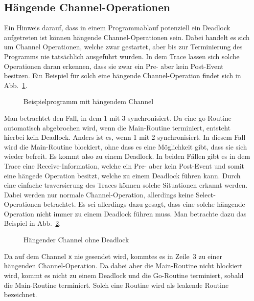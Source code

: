 \subsection{Hängende Channel-Operationen} 
Ein Hinweis darauf, dass in einem Programmablauf potenziell ein Deadlock aufgetreten ist können hängende Channel-Operationen
sein. Dabei handelt es sich um Channel Operationen, welche zwar gestartet, aber bis zur Terminierung des 
Programms nie tatsächlich ausgeführt wurden. In dem Trace lassen sich solche Operationen daran erkennen, dass sie 
zwar ein Pre- aber kein Post-Event besitzen. Ein Beispiel für solch eine hängende Channel-Operation findet sich in 
Abb.~\ref{Chap:Analyze-Sec:Channel-SubSec:Dangling-Fig:ExDangling}.
\begin{figure}[h!]
  
  \caption{Beispielprogramm mit hängendem Channel}
  \label{Chap:Analyze-Sec:Channel-SubSec:Dangling-Fig:ExDangling}
\end{figure}
Man betrachtet den Fall, in dem 1 mit 3 synchronisiert. Da eine go-Routine automatisch abgebrochen wird, 
wenn die Main-Routine terminiert, entsteht hierbei kein Deadlock. Anders ist es, wenn 1 mit 2 synchronisiert. 
In diesem Fall wird die Main-Routine blockiert, ohne dass es eine Möglichkeit gibt, dass sie sich wieder 
befreit. Es kommt also zu einem Deadlock. In beiden Fällen gibt es in dem Trace eine Receive-Information, 
welche ein Pre- aber kein Post-Event und somit eine hängede Operation besitzt, welche zu einem Deadlock 
führen kann. Durch eine einfache traversierung des Traces können solche Situationen erkannt werden. Dabei 
werden nur normale Channel-Operation, allerdings keine Select-Operationen betrachtet.
Es sei allerdings dazu gesagt, dass eine solche hängende Operation nicht immer zu einem Deadlock führen muss.
Man betrachte dazu das Beispiel in Abb.~\ref{Chap:Analyze-Sec:Channel-SubSec:Dangling-Fig:ExDanglingWithout}.
\begin{figure}[h!]
  
  \caption{Hängender Channel ohne Deadlock}
  \label{Chap:Analyze-Sec:Channel-SubSec:Dangling-Fig:ExDanglingWithout}
\end{figure}
Da auf dem Channel \texttt{x} nie gesendet wird, kommtes es in Zeile~3 zu einer hängenden Channel-Operation. Da 
dabei aber die Main-Routine nicht blockiert wird, kommt es nicht zu einem Deadlock und die Go-Routine 
terminiert, sobald die Main-Routine terminiert. Solch eine Routine wird als leakende Routine bezeichnet. 
